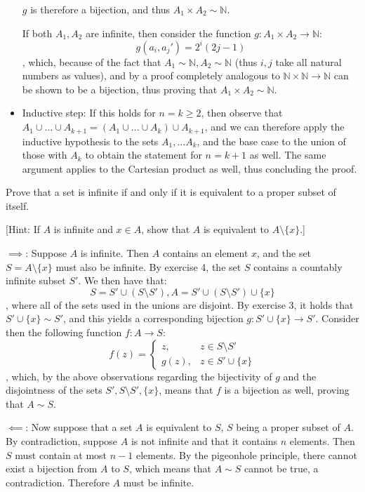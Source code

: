 \begin{solution}
\begin{itemize}
        $g$ is therefore a bijection, and thus $A_1 \times A_2 \sim \mathbb{N}$.

        If both $A_1, A_2$ are infinite, then consider the function $g: A_1 \times A_2 \rightarrow \mathbb{N}$:
        $$g(a_i, a_j') = 2^i(2j - 1)$$
        , which, because of the fact that $A_1 \sim \mathbb{N}, A_2 \sim \mathbb{N}$ (thus $i, j$ take all natural numbers as values), and by a proof completely analogous to $\mathbb{N} \times \mathbb{N} \rightarrow \mathbb{N}$ can be shown to be a bijection, thus proving that $A_1 \times A_2 \sim \mathbb{N}$.
        \item Inductive step: If this holds for $n = k \geq 2$, then observe that $A_1 \cup \ldots \cup A_{k+1} = (A_1 \cup \ldots \cup A_k) \cup A_{k+1}$, and we can therefore apply the inductive hypothesis to the sets $A_1, \ldots A_k$, and the base case to the union of those with $A_k$ to obtain the statement for $n = k+1$ as well.
        The same argument applies to the Cartesian product as well, thus concluding the proof.
    \end{itemize}

\end{solution}

\begin{exercise}{5}
    Prove that a set is infinite if and only if it is equivalent to a proper subset of itself.

    [Hint: If $A$ is infinite and $x \in A$, show that $A$ is equivalent to $A \setminus \{x\}.$]
\end{exercise}

\begin{solution}

    $\implies$: Suppose $A$ is infinite.
    Then $A$ contains an element $x$, and the set $S = A \setminus \{x\}$ must also be infinite.
    By exercise 4, the set $S$ contains a countably infinite subset $S'$.
    We then have that:
    $$S = S' \cup (S \setminus S'), A = S' \cup (S \setminus S') \cup \{x\}$$
    , where all of the sets used in the unions are disjoint.
    By exercise 3, it holds that $S' \cup \{x\} \sim S'$, and this yields a corresponding bijection $g: S' \cup \{x\} \rightarrow S'$.
    Consider then the following function $f: A \rightarrow S$:
    $$f(z) = \begin{cases}
        z,& z \in S \setminus S' \\
        g(z),& z \in S' \cup \{x\}
    \end{cases}$$
    , which, by the above observations regarding the bijectivity of $g$ and the disjointness of the sets $S', S \setminus S', \{x\}$, means that $f$ is a bijection as well, proving that $A \sim S$.
    
    $\impliedby$: Now suppose that a set $A$ is equivalent to $S$, $S$ being a proper subset of $A$. 
    By contradiction, suppose $A$ is not infinite and that it contains $n$ elements.
    Then $S$ must contain at most $n - 1$ elements.
    By the pigeonhole principle, there cannot exist a bijection from $A$ to $S$, which means that $A \sim S$ cannot be true, a contradiction.
    Therefore $A$ must be infinite.
\end{solution}


